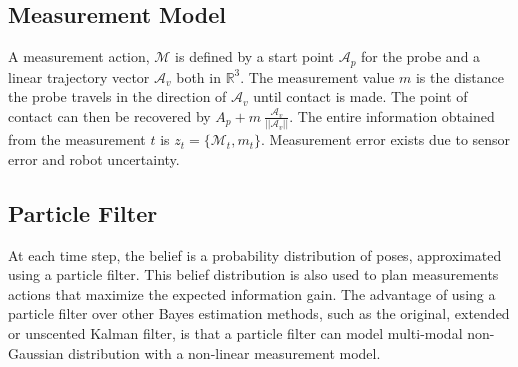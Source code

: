 \documentclass[letterpaper, 10 pt, conference]{ieeeconf}
\newcommand{\maction}{\mathcal{M}}
\newcommand{\measurement}{m}
\begin{document}
\subsection{Measurement Model}



A measurement action, $\maction$ is defined by a start point $\mathcal{A}_p$ for the probe and a linear trajectory vector $\mathcal{A}_v$ both in $\mathbb{R}^3$. 
The measurement value $\measurement$ is the distance the probe travels in the direction of $\mathcal{A}_v$ until contact is made. 
The point of contact can then be recovered by $A_p + \measurement \  \frac{\mathcal{A}_v}{||\mathcal{A}_v||}$. 
The entire information obtained from the measurement $t$ is $z_t = \{\maction_t, \measurement_t\}$.
Measurement error exists due to sensor error and robot uncertainty. 


\subsection{Particle Filter} 

At each time step, the belief is a probability distribution of poses, approximated using a particle filter. 
This belief distribution is also used to plan measurements actions that maximize the expected information gain. 
The advantage of using a particle filter over other Bayes estimation methods, such as the original\cite{kalman1960new}, extended\cite{kalman1961new} or unscented\cite{julier1997new} Kalman filter, is that a particle filter can model multi-modal non-Gaussian distribution with a non-linear measurement model.
\end{document}
